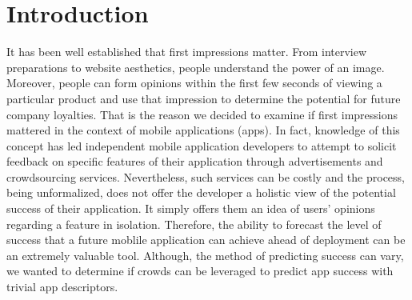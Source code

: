\section{Introduction}


It has been well established that first impressions matter. From interview preparations to website aesthetics, people understand the power of an image. Moreover, people can form opinions within the first few seconds of viewing a particular product and use that impression to determine the potential for future company loyalties. That is the reason we decided to examine if first impressions mattered in the context of mobile applications (apps).  In fact, knowledge of this concept has led independent mobile application developers to attempt to solicit feedback on specific features of their application through advertisements and crowdsourcing services. Nevertheless, such services can be costly and the process, being unformalized, does not offer the developer a holistic view of the potential success of their application.  It simply offers them an idea of users' opinions regarding a feature in isolation.  Therefore, the ability to forecast the level of success that a future moblile application can achieve ahead of deployment can be an extremely valuable tool\cite{tohidi06:getting}. Although, the method of predicting success can vary, we wanted to determine if crowds can be leveraged to predict app success with trivial app descriptors. \\  


